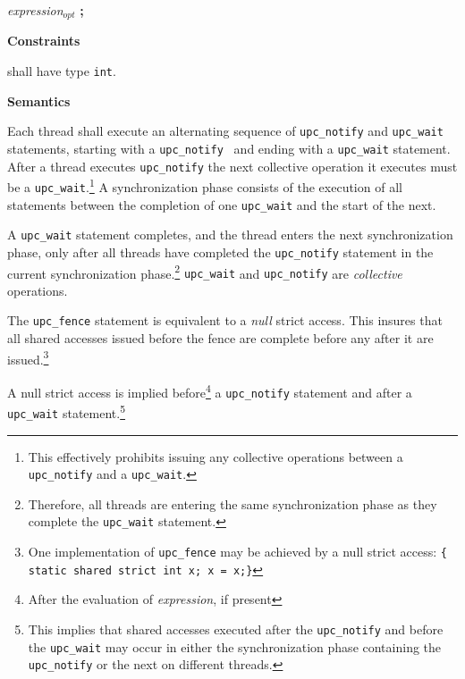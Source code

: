 \hspace{3em}{\bf upc\_barrier} {\em expression$_{opt}$} {\bf ;}

\hspace{3em}{\bf upc\_fence ;}

{\bf Constraints} 

 shall have
type {\tt int}. 


{\bf Semantics} 


\np Each thread shall execute an alternating sequence of
     {\tt upc\_notify} and {\tt upc\_wait} statements, starting with a
     {\tt upc\_notify } and ending with a {\tt upc\_wait} statement.   After a
     thread executes {\tt upc\_notify} the next collective operation it executes
     must be a {\tt upc\_wait}.\footnote{This effectively prohibits issuing any
     collective operations between a {\tt upc\_notify} and  a {\tt upc\_wait}.}
     A synchronization phase consists of the execution of all statements
     between the completion of one {\tt upc\_wait} and the start of
     the next.

\np A {\tt upc\_wait} statement completes, and the
     thread enters the next synchronization phase, only after all
     threads have completed the {\tt upc\_notify} statement in the
     current synchronization phase.\footnote{Therefore,
     all threads are entering the same synchronization phase as they
     complete the {\tt upc\_wait} statement.}  {\tt upc\_wait}
     and {\tt upc\_notify} are {\em collective} operations.

\np The {\tt upc\_fence} statement is equivalent to a {\em
    null} strict access.  This insures that all shared accesses
    issued before the fence are complete before any after it are
    issued.\footnote{One implementation of {\tt upc\_fence} 
    may be achieved by a null strict access:
     {\tt  \{ static shared strict int x; x = x;\}}} 

\np A null strict access is implied before\footnote{After the evaluation 
    of {\em expression}, if present} a {\tt upc\_notify} statement and 
    after a {\tt upc\_wait} 
    statement.\footnote{This implies that shared accesses executed 
    after the {\tt upc\_notify} and before the {\tt upc\_wait} may occur in 
    either the synchronization phase containing the {\tt upc\_notify} or 
    the next on different threads.}

